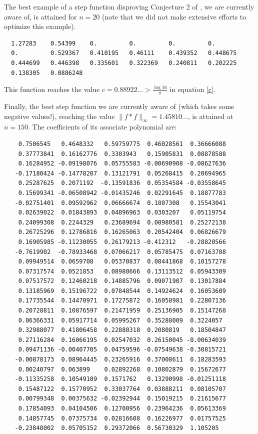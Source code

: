 \documentclass[12pt]{amsart}
\theoremstyle{definition}
\begin{document}
\medskip

The best example of a step function disproving Conjecture 2 of
\cite{martin}, we are currently aware of, is attained for $n=20$
(note that we did not make extensive efforts to optimize this
example). {\footnotesize
\begin{verbatim}
  1.27283    0.54399    0.         0.         0.         0.
  0.         0.529367   0.410195   0.46111    0.439352   0.448675
  0.444699   0.446398   0.335601   0.322369   0.240811   0.202225
  0.138305   0.0886248
\end{verbatim}
} This function reaches the value  $c=0.88922...> \frac{\log
16}{\pi}$ in equation \eqref{c}.

\medskip

Finally, the best step function we are currently aware of (which takes some negative values!), reaching the value
$\| f \ast f \|_{\infty} = 1.45810...$, is attained at $n=150$. The coefficients of its associate polynomial are:
{\footnotesize
\begin{verbatim}
    0.7506545   0.4648332   0.59759775  0.46028561  0.36666088
    0.37773841  0.16162776  0.3303943   0.15905831  0.08878588
    0.16284952 -0.09198076  0.05755583 -0.00690908 -0.08627636
   -0.17180424 -0.14778207  0.13121791  0.05268415  0.20694965
    0.25287625  0.2071192  -0.13591836  0.05354584 -0.03558645
    0.15699341 -0.06508942 -0.01435246  0.02291645  0.18877783
   -0.02751401  0.09592962  0.06666674  0.1807308   0.15543041
    0.02639022  0.01843893  0.04896963  0.0303207   0.05119754
    0.24099308  0.2244329   0.23689694  0.08980581  0.25272138
    0.26725296  0.12786816  0.16265063  0.20542404  0.06826679
    0.16905985 -0.11230055  0.26179213 -0.412312   -0.28820566
   -0.7619902  -0.78933468  0.07066217  0.05785475  0.07163788
    0.09949514  0.0659708   0.05370837  0.08441868  0.10157278
    0.07317574  0.0521853   0.08980666  0.13113512  0.05943309
    0.07517572  0.12460218  0.14885796  0.09071907  0.13017884
    0.13185969  0.15196722  0.07848544  0.14924624  0.16053609
    0.17735544  0.14470971  0.17275872  0.16058981  0.22807136
    0.20728811  0.10876597  0.21471959  0.25136905  0.15147268
    0.06366331  0.05917714  0.05995267  0.35288009  0.3224057
    0.32988077  0.41806458  0.22880318  0.2080819   0.18504847
    0.27116284  0.16066195  0.02547032  0.26150045 -0.00634039
    0.09471136 -0.00407705  0.04759596 -0.07549638 -0.30815721
   -0.00878173  0.08964445  0.23265916  0.37008611  0.18283593
    0.00240797  0.063899    0.02892268  0.10802879  0.15672677
   -0.11335258  0.10549109  0.1571762   0.13290998 -0.01251118
    0.15487122  0.15770952  0.33037764  0.03888211  0.08105707
    0.00799348  0.00375632 -0.02392944  0.15019215  0.21615677
    0.17854093  0.04104506  0.12700956  0.23964236  0.05613369
    0.14857745  0.07375734  0.02816608  0.16226977  0.01757525
   -0.23848002  0.05705152  0.29372066  0.56730329  1.105205
\end{verbatim}
}
\end{document}
